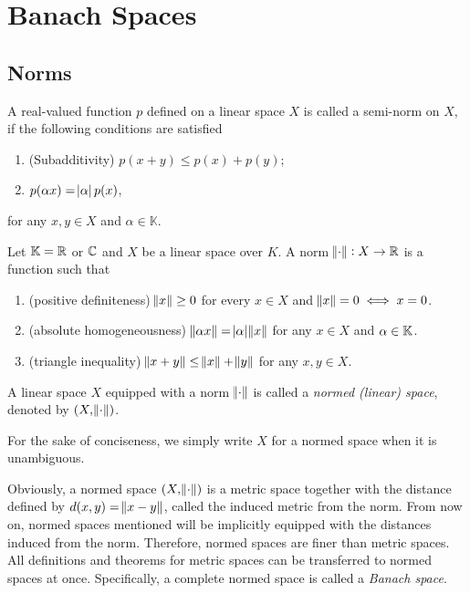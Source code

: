 \chapter{Banach Spaces}
\label{chp:banach_spaces}
\section{Norms}
\begin{defn}
A real-valued function $p$ defined on a linear space $X$ is called a 
semi-norm on $X$, if the following conditions are satisfied 
\begin{enumerate}
    \item (Subadditivity) $p(x+y) \le p(x) + p(y)$;
    \item $p(\alpha x) = \abs{\alpha} p(x)$, 
\end{enumerate}
for any $x, y \in X$ and $\alpha \in \mathbb{K}$. 
\end{defn}

\begin{defn}[norm]
Let $\mathbb{K} = \mathbb{R}$ or $\mathbb{C}$ and $X$ be a linear space over $K$. 
A norm $\norm{\mathord{\cdot}}: X \to \mathbb{R}$ is a function such that 
\begin{enumerate}
    \item (positive definiteness) $\norm{x} \ge 0$ for every $x \in X$ and 
    $\norm{x} = 0 \iff x = 0$. 
    \item (absolute homogeneousness) $\norm{\alpha x} = \abs{\alpha} 
    \norm{x}$ for any $x \in X$ and $\alpha \in \mathbb{K}$. 
    \item (triangle inequality) $\norm{x + y} \le \norm{x} + \norm{y}$ for 
    any $x, y \in X$.
\end{enumerate}
\end{defn}

\begin{defn}
A linear space $X$ equipped with a norm $\norm{\mathord{\cdot}}$ is called a 
\emph{normed (linear) space}, denoted by $(X, \norm{\mathord{\cdot}})$. 
\end{defn}

For the sake of conciseness, we simply write $X$ for a normed space when it 
is unambiguous. 

Obviously, a normed space $(X, \norm{\mathord{\cdot}})$ is a metric space together 
with the distance defined by $d(x, y) = \norm{x - y}$, called the induced 
metric from the norm. 
From now on, normed spaces mentioned will be implicitly equipped with the 
distances induced from the norm. 
Therefore, normed spaces are finer than metric spaces. 
All definitions and theorems for metric spaces can be transferred to normed 
spaces at once. 
Specifically, a complete normed space is called a \emph{Banach space}. 

